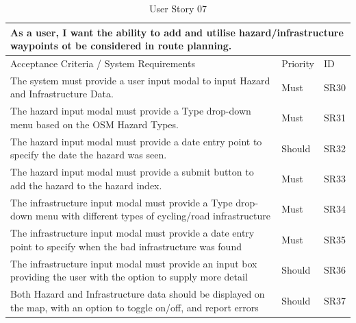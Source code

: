 \begin{table}[!htb]
\caption{User Story 07}
\label{tab:user-story-07}
\begin{tabular}{ p{8cm} p{1cm}  p{1cm} }
\hline
\multicolumn{3}{p{13cm}}{As a user, I want the ability to add and utilise hazard/infrastructure waypoints ot be considered in route planning.}\\ 
\hline
Acceptance Criteria / System Requirements & Priority & ID\\
\hline
The system must provide a user input modal to input Hazard and Infrastructure Data. & Must & SR30 \\
The hazard input modal must provide a Type drop-down menu based on the OSM Hazard Types. & Must & SR31\\
The hazard input modal must provide a date entry point to specify the date the hazard was seen. & Should & SR32\\
The hazard input modal must provide a submit button to add the hazard to the hazard index. & Must & SR33\\
The infrastructure input modal must provide a Type drop-down menu with different types of cycling/road infrastructure & Must & SR34\\
The infrastructure input modal must provide a date entry point to specify when the bad infrastructure was found & Must & SR35\\
The infrastructure input modal must provide an input box providing the user with the option to supply more detail & Should & SR36\\
Both Hazard and Infrastructure data should be displayed on the map, with an option to toggle on/off, and report errors & Should & SR37\\
\hline
\end{tabular}
\end{table}
